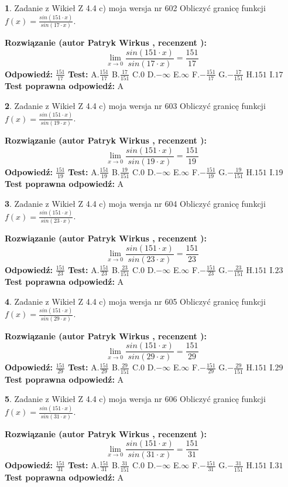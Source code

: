 \documentclass[12pt, a4paper]{article}
\theoremstyle{definition} %
\newtheorem{zad}{}
\newcommand{\zadStart}[1]{\begin{zad}#1\newline}
\newcommand{\zadStop}{\end{zad}}
\newcommand{\rozwStart}[2]{\noindent \textbf{Rozwiązanie (autor #1 , recenzent #2): }\newline}
\newcommand{\rozwStop}{\newline}
\newcommand{\odpStart}{\noindent \textbf{Odpowiedź:}\newline}
\newcommand{\odpStop}{\newline}
\newcommand{\testStart}{\noindent \textbf{Test:}\newline}
\newcommand{\testStop}{\newline}
\newcommand{\kluczStart}{\noindent \textbf{Test poprawna odpowiedź:}\newline}
\newcommand{\kluczStop}{\newline}
\begin{document}
\zadStart{Zadanie z Wikieł Z 4.4 c) moja wersja nr 602}
Obliczyć granicę funkcji $f(x)=\frac{sin(151\cdot x)}{sin(17\cdot x)}$.
\zadStop
\rozwStart{Patryk Wirkus}{}
$$\lim\limits_{x\to 0}\frac{sin(151\cdot x)}{sin(17\cdot x)}=
\frac{151}{17}$$
\rozwStop
\odpStart
$\frac{151}{17}$
\odpStop
\testStart
A.$\frac{151}{17}$
B.$\frac{17}{151}$
C.$0$
D.$-\infty$
E.$\infty$
F.$-\frac{151}{17}$
G.$-\frac{17}{151}$
H.$151$
I.$17$
\testStop
\kluczStart
A
\kluczStop



\zadStart{Zadanie z Wikieł Z 4.4 c) moja wersja nr 603}
Obliczyć granicę funkcji $f(x)=\frac{sin(151\cdot x)}{sin(19\cdot x)}$.
\zadStop
\rozwStart{Patryk Wirkus}{}
$$\lim\limits_{x\to 0}\frac{sin(151\cdot x)}{sin(19\cdot x)}=
\frac{151}{19}$$
\rozwStop
\odpStart
$\frac{151}{19}$
\odpStop
\testStart
A.$\frac{151}{19}$
B.$\frac{19}{151}$
C.$0$
D.$-\infty$
E.$\infty$
F.$-\frac{151}{19}$
G.$-\frac{19}{151}$
H.$151$
I.$19$
\testStop
\kluczStart
A
\kluczStop



\zadStart{Zadanie z Wikieł Z 4.4 c) moja wersja nr 604}
Obliczyć granicę funkcji $f(x)=\frac{sin(151\cdot x)}{sin(23\cdot x)}$.
\zadStop
\rozwStart{Patryk Wirkus}{}
$$\lim\limits_{x\to 0}\frac{sin(151\cdot x)}{sin(23\cdot x)}=
\frac{151}{23}$$
\rozwStop
\odpStart
$\frac{151}{23}$
\odpStop
\testStart
A.$\frac{151}{23}$
B.$\frac{23}{151}$
C.$0$
D.$-\infty$
E.$\infty$
F.$-\frac{151}{23}$
G.$-\frac{23}{151}$
H.$151$
I.$23$
\testStop
\kluczStart
A
\kluczStop



\zadStart{Zadanie z Wikieł Z 4.4 c) moja wersja nr 605}
Obliczyć granicę funkcji $f(x)=\frac{sin(151\cdot x)}{sin(29\cdot x)}$.
\zadStop
\rozwStart{Patryk Wirkus}{}
$$\lim\limits_{x\to 0}\frac{sin(151\cdot x)}{sin(29\cdot x)}=
\frac{151}{29}$$
\rozwStop
\odpStart
$\frac{151}{29}$
\odpStop
\testStart
A.$\frac{151}{29}$
B.$\frac{29}{151}$
C.$0$
D.$-\infty$
E.$\infty$
F.$-\frac{151}{29}$
G.$-\frac{29}{151}$
H.$151$
I.$29$
\testStop
\kluczStart
A
\kluczStop



\zadStart{Zadanie z Wikieł Z 4.4 c) moja wersja nr 606}
Obliczyć granicę funkcji $f(x)=\frac{sin(151\cdot x)}{sin(31\cdot x)}$.
\zadStop
\rozwStart{Patryk Wirkus}{}
$$\lim\limits_{x\to 0}\frac{sin(151\cdot x)}{sin(31\cdot x)}=
\frac{151}{31}$$
\rozwStop
\odpStart
$\frac{151}{31}$
\odpStop
\testStart
A.$\frac{151}{31}$
B.$\frac{31}{151}$
C.$0$
D.$-\infty$
E.$\infty$
F.$-\frac{151}{31}$
G.$-\frac{31}{151}$
H.$151$
I.$31$
\testStop
\kluczStart
A
\kluczStop
\end{document}

